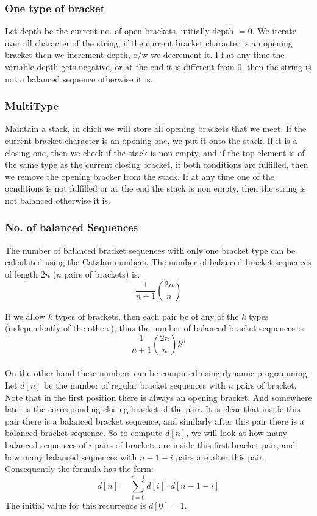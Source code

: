 \documentclass[8pt, a4paper, oneside, twocolumn]{extarticle}
\begin{document}
\subsubsection{One type of bracket}
Let depth be the current no. of open brackets, initially depth $= 0$. We iterate over all character of the string; if the current bracket character is an opening bracket then we increment depth, o/w we decrement it. I f at any time the variable depth gets negative, or at the end it is different from 0, then the string is not a balanced sequence otherwise it is.
\subsubsection{MultiType}
Maintain a stack, in chich we will store all opening brackets that we meet. If the current bracket character is an opening one, we put it onto the stack. If it is a closing one, then we check if the stack is non empty, and if the top element is of the same type as the current closing bracket, if both conditions are fulfilled, then we remove the opening bracker from the stack. If at any time one of the ocnditions is not fulfilled or at the end the stack is non empty, then the string is not balanced otherwise it is.
\subsubsection{No. of balanced Sequences}
The number of balanced bracket sequences with only one bracket type can be calculated using the Catalan numbers. The number of balanced bracket sequences of length $2n$ ($n$ pairs of brackets) is: $$\frac{1}{n+1} \binom{2n}{n}$$

If we allow $k$ types of brackets, then each pair be of any of the $k$ types (independently of the others), thus the number of balanced bracket sequences is: $$\frac{1}{n+1} \binom{2n}{n} k^n$$\\
On the other hand these numbers can be computed using dynamic programming. Let $d[n]$ be the number of regular bracket sequences with $n$ pairs of bracket. Note that in the first position there is always an opening bracket. And somewhere later is the corresponding closing bracket of the pair. It is clear that inside this pair there is a balanced bracket sequence, and similarly after this pair there is a balanced bracket sequence. So to compute $d[n]$, we will look at how many balanced sequences of $i$ pairs of brackets are inside this first bracket pair, and how many balanced sequences with $n-1-i$ pairs are after this pair. Consequently the formula has the form: $$d[n] = \sum_{i=0}^{n-1} d[i] \cdot d[n-1-i]$$ The initial value for this recurrence is $d[0] = 1$.
\end{document}
